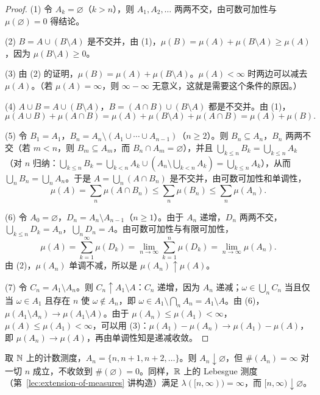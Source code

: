 \begin{proof}
(1) 令 $A_k=\varnothing$（$k>n$），则 $A_1,A_2,\dots$ 两两不交，由可数可加性与 $\mu(\varnothing)=0$ 得结论。

(2) $B=A\cup(B\setminus A)$ 是不交并，由 (1)，$\mu(B)=\mu(A)+\mu(B\setminus A)\geqslant\mu(A)$，因为 $\mu(B\setminus A)\geqslant0$。

(3) 由 (2) 的证明，$\mu(B)=\mu(A)+\mu(B\setminus A)$。$\mu(A)<\infty$ 时两边可以减去 $\mu(A)$。（若 $\mu(A)=\infty$，则 $\infty-\infty$ 无意义，这就是需要这个条件的原因。）

(4) $A\cup B=A\cup(B\setminus A)$，$B=(A\cap B)\cup(B\setminus A)$ 都是不交并。由 (1)，
\[
\mu(A\cup B)+\mu(A\cap B)=\mu(A)+\mu(B\setminus A)+\mu(A\cap B)=\mu(A)+\mu(B).
\]

(5) 令 $B_1=A_1$，$B_n=A_n\setminus(A_1\cup\cdots\cup A_{n-1})$（$n\geqslant2$）。则 $B_n\subseteq A_n$，$B_n$ 两两不交（若 $m<n$，则 $B_m\subseteq A_m$，而 $B_n\cap A_m=\varnothing$），并且 $\bigcup_{k\leqslant n}B_k=\bigcup_{k\leqslant n}A_k$（对 $n$ 归纳：$\bigcup_{k\leqslant n}B_k=\bigcup_{k<n}A_k\cup(A_n\setminus\bigcup_{k<n}A_k)=\bigcup_{k\leqslant n}A_k$），从而 $\bigcup_nB_n=\bigcup_nA_n$。于是 $A=\bigcup_n(A\cap B_n)$ 是不交并，由可数可加性和单调性，
\[
\mu(A)=\sum_n\mu(A\cap B_n)\leqslant\sum_n\mu(B_n)\leqslant\sum_n\mu(A_n).
\]

(6) 令 $A_0=\varnothing$，$D_n=A_n\setminus A_{n-1}$（$n\geqslant1$）。由于 $A_n$ 递增，$D_n$ 两两不交，$\bigcup_{k\leqslant n}D_k=A_n$，$\bigcup_nD_n=A$。由可数可加性与有限可加性，
\[
\mu(A)=\sum_{k=1}^\infty\mu(D_k)=\lim_{n\to\infty}\sum_{k=1}^n\mu(D_k)=\lim_{n\to\infty}\mu(A_n).
\]
由 (2)，$\mu(A_n)$ 单调不减，所以是 $\mu(A_n)\uparrow\mu(A)$。

(7) 令 $C_n=A_1\setminus A_n$。则 $C_n\uparrow A_1\setminus A$：$C_n$ 递增，因为 $A_n$ 递减；$\omega\in\bigcup_nC_n$ 当且仅当 $\omega\in A_1$ 且存在 $n$ 使 $\omega\notin A_n$，即 $\omega\in A_1\setminus\bigcap_nA_n=A_1\setminus A$。由 (6)，$\mu(A_1\setminus A_n)\to\mu(A_1\setminus A)$。由于 $\mu(A_n)\leqslant\mu(A_1)<\infty$，$\mu(A)\leqslant\mu(A_1)<\infty$，可以用 (3)：$\mu(A_1)-\mu(A_n)\to\mu(A_1)-\mu(A)$，即 $\mu(A_n)\to\mu(A)$，再由单调性知是递减收敛。
\end{proof}

\begin{example}[从上连续需要有限性]
取 $\mathbb{N}$ 上的计数测度，$A_n=\{n,n+1,n+2,\dots\}$。则 $A_n\downarrow\varnothing$，但 $\#(A_n)=\infty$ 对一切 $n$ 成立，不收敛到 $\#(\varnothing)=0$。同样，$\mathbb{R}$ 上的 Lebesgue 测度（第~\ref{lec:extension-of-measures} 讲构造）满足 $\lambda([n,\infty))=\infty$，而 $[n,\infty)\downarrow\varnothing$。
\end{example}


